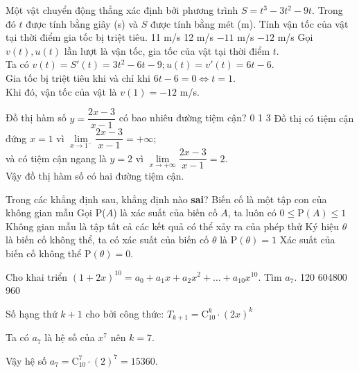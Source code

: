 \begin{ex}%
Một vật chuyển động thẳng xác định bởi phương trình $ S= t^3 - 3t^2 - 9t. $	 Trong đó $ t $ được tính bằng giây (s) và $ S $ được tính bằng mét (m). Tính vận tốc của vật tại thời điểm gia tốc bị triệt tiêu.
	\choice
	{11 m/s}
	{12 m/s}
	{$ -11 $ m/s}
	{\True $ -12 $ m/s}
	\loigiai
	{	
Gọi $ v(t), u(t) $ lần lượt là vận tốc, gia tốc của vật tại thời điểm $ t $.\\
Ta có $ v(t) = S'(t)= 3t^2 - 6t - 9;  u(t) = v'(t)  =6t - 6$.\\
Gia tốc bị triệt tiêu khi và chỉ khi $ 6t - 6 = 0 \Leftrightarrow t = 1.$\\
Khi đó, vận tốc của vật là $ v(1) = -12 $ m/s.
	}
\end{ex}	
\begin{ex}%
	Đồ thị hàm số $ y = \dfrac{2x - 3}{x-1} $ có bao nhiêu đường tiệm cận?
	\choice
	{0}
	{1}
	{}
	{3}
	\loigiai
	{	
	Đồ thị có tiệm cận đứng $ x = 1  $	 vì $ \lim\limits_{x \to 1^-} \dfrac{2x - 3}{x-1} = + \infty $; \\
	và có tiệm cận ngang là $ y = 2  $ vì $ \lim\limits_{x \to +\infty} \dfrac{2x - 3}{x-1} = 2. $
\\	Vậy đồ thị hàm số có hai đường tiệm cận.
	}
\end{ex}	
\begin{ex}%
	Trong các khẳng định sau, khẳng định nào \textbf{sai}?
	\choice
	{Biến cố là một tập con của không gian mẫu}
	{Gọi $\mathrm{P}$($ A $) là xác suất của biến cố $ A $, ta luôn có $ 0 \leq \mathrm{P}(A) \leq 1 $}
	{Không gian mẫu là tập tất cả các kết quả có thể xảy ra của phép thử}
	{\True Ký hiệu $ \theta $ là biến cố không thể, ta có xác suất của biến cố $ \theta $ là $ \mathrm{P}( \theta ) = 1 $}
	\loigiai
	{	
	Xác suất của biến cố không thể $ \mathrm{P}( \theta ) = 0. $	
	}
\end{ex}	
\begin{ex}%
	Cho khai triển $ (1+2x)^{10} = a_0 + a_1x + a_2x^2 + \dots +  a_{10}x^{10} $. Tìm $ a_7. $
	\choice
	{120}
	{}
	{604800}
	{960}
	\loigiai
	{	

Số hạng thứ $ k+1 $ cho bởi công thức: $ T_{k+1} = \mathrm{C}_{10}^k \cdot (2x)^k  $

	Ta có $ a_7 $ là hệ số của $ x^7 $	nên $ k = 7. $
	
	Vậy hệ số $ a_7 = \mathrm{C}_{10}^7 \cdot (2)^7 = 15360. $
	}
\end{ex}	
